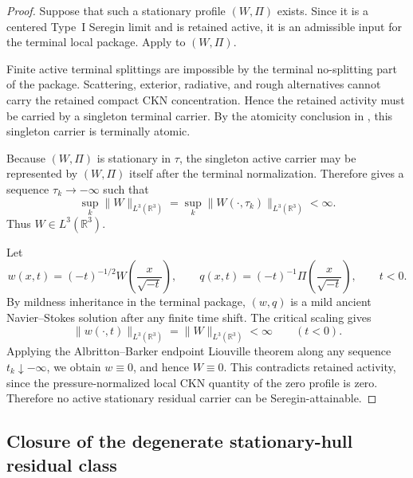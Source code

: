 \begin{proof}
Suppose that such a stationary profile \((W,\Pi)\) exists.  Since it is a
centered Type~I Seregin limit and is retained active, it is an admissible input
for the terminal local package.  Apply  to
\((W,\Pi)\).

Finite active terminal splittings are impossible by the terminal no-splitting
part of the package.  Scattering, exterior, radiative, and rough alternatives
cannot carry the retained compact CKN concentration.  Hence the retained
activity must be carried by a singleton terminal carrier.  By the atomicity
conclusion in , this singleton carrier is
terminally atomic.

Because \((W,\Pi)\) is stationary in \(\tau\), the singleton active carrier may
be represented by \((W,\Pi)\) itself after the terminal normalization.  Therefore
 gives a sequence \(\tau_k\to-\infty\) such that
\begin{equation}\label{eq:R3S-W-L3-sequence}
   \sup_k\|W\|_{L^3(\mathbb R^3)}
   =
   \sup_k\|W(\cdot,\tau_k)\|_{L^3(\mathbb R^3)}
   <\infty .
\end{equation}
Thus \(W\in L^3(\mathbb R^3)\).

Let
\begin{equation}\label{eq:R3S-physical-pullback}
   w(x,t)=(-t)^{-1/2}W\!\left(\frac{x}{\sqrt{-t}}\right),
   \qquad
   q(x,t)=(-t)^{-1}\Pi\!\left(\frac{x}{\sqrt{-t}}\right),
   \qquad t<0 .
\end{equation}
By mildness inheritance in the terminal package, \((w,q)\) is a mild ancient
Navier--Stokes solution after any finite time shift.  The critical scaling gives
\begin{equation}\label{eq:R3S-critical-L3-scaling}
   \|w(\cdot,t)\|_{L^3(\mathbb R^3)}=\|W\|_{L^3(\mathbb R^3)}<\infty
   \qquad (t<0).
\end{equation}
Applying the Albritton--Barker endpoint Liouville theorem along any sequence
\(t_k\downarrow-\infty\), we obtain \(w\equiv0\), and hence \(W\equiv0\).
This contradicts retained activity, since the pressure-normalized local CKN
quantity of the zero profile is zero.  Therefore no active stationary residual
carrier can be Seregin-attainable.
\end{proof}

\subsection{Closure of the degenerate stationary-hull residual class}

